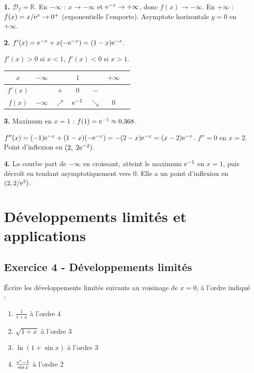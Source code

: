 \documentclass[12pt,a4paper]{article}
\begin{document}
\begin{boitecorrige}
\textbf{1.} $\mathcal{D}_f = \mathbb{R}$. En $-\infty$ : $x\to-\infty$ et $\mathrm{e}^{-x}\to+\infty$, donc $f(x)\to-\infty$. En $+\infty$ : $f(x)=x/\mathrm{e}^x\to0^+$ (exponentielle l'emporte). Asymptote horizontale $y=0$ en $+\infty$.

\textbf{2.} $f'(x) = \mathrm{e}^{-x} + x(-\mathrm{e}^{-x}) = (1-x)\mathrm{e}^{-x}$.

$f'(x)>0$ si $x<1$, $f'(x)<0$ si $x>1$.

\begin{center}
\begin{tabular}{|c|cccccc|}
\hline
$x$ & $-\infty$ & & $1$ & & $+\infty$\\
\hline
$f'(x)$ & & $+$ & $0$ & $-$ &\\
\hline
$f(x)$ & $-\infty$ & $\nearrow$ & $\mathrm{e}^{-1}$ & $\searrow$ & $0$\\
\hline
\end{tabular}
\end{center}

\textbf{3.} Maximum en $x=1$ : $f(1)=\mathrm{e}^{-1}\approx0{,}368$.

$f''(x) = (-1)\mathrm{e}^{-x}+(1-x)(-\mathrm{e}^{-x}) = -(2-x)\mathrm{e}^{-x}=(x-2)\mathrm{e}^{-x}$.
$f''=0$ en $x=2$. Point d'inflexion en $(2,\;2\mathrm{e}^{-2})$.

\textbf{4.} La courbe part de $-\infty$ en croissant, atteint le maximum $\mathrm{e}^{-1}$ en $x=1$, puis décroît en tendant asymptotiquement vers $0$. Elle a un point d'inflexion en $(2, 2/\mathrm{e}^2)$.
\end{boitecorrige}

\section{Développements limités et applications}

\subsection*{Exercice 4 - Développements limités \niveau{\moyen}}

\begin{boiteexercice}
Écrire les développements limités suivants au voisinage de $x=0$, à l'ordre indiqué :
\begin{enumerate}[label=(\alph*)]
  \item $\frac{1}{1+x}$ à l'ordre 4
  \item $\sqrt{1+x}$ à l'ordre 3
  \item $\ln(1+\sin x)$ à l'ordre 3
  \item $\frac{\mathrm{e}^x-1}{\sin x}$ à l'ordre 2
\end{enumerate}
\end{boiteexercice}
\end{document}
